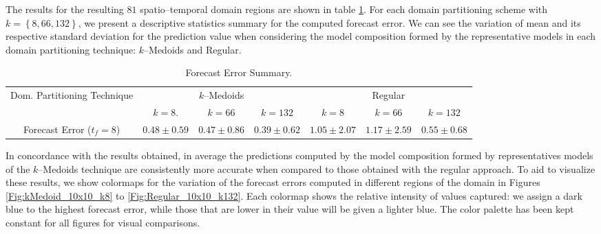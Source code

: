 The results for the resulting $81$ spatio--temporal domain regions are shown in table \ref{Table:Query10x10_kMedoids_Regular_StatSummary}. For each domain partitioning scheme with $k = \left\{8, 66, 132 \right\}$, we present a descriptive statistics summary for the computed forecast error. We can see the variation of mean and its respective standard deviation for the prediction value when considering the model composition formed by the representative models in each domain partitioning technique: $k$--Medoids and Regular.

\begin{table}[h!]
	\centering
	\tiny
	\begin{tabular}{|c|c|c|c|c|c|c|}
		\hline
		\multirow{2}{*}{Dom. Partitioning Technique} & \multicolumn{3}{c|}{$k$--Medoids} & \multicolumn{3}{c|}{Regular} \\
		\cline{2-7}
		& $k = 8$. & $k = 66$ & $k = 132$ & $k = 8$ & $k = 66$ & $k = 132$ \\
		\cline{2-7}
		\hline
		Forecast Error ($t_{f}=8$) & $0.48 \pm 0.59$ & $0.47 \pm 0.86$ & $0.39 \pm 0.62$ & $1.05 \pm 2.07$ & $1.17 \pm 2.59$ & $0.55 \pm 0.68$	 \\
		\hline
	\end{tabular}
	\caption{Forecast Error Summary.}
	\label{Table:Query10x10_kMedoids_Regular_StatSummary}
\end{table}

In concordance with the results obtained, in average the predictions computed by the model composition formed by representatives models of the $k$--Medoids technique are consistently more accurate when compared to those obtained with the regular approach. To aid to visualize these results, we show colormaps for the variation of the forecast errors computed in different regions of the domain in Figures \ref{Fig:kMedoid_10x10_k8} to \ref{Fig:Regular_10x10_k132}. Each colormap shows the relative intensity of values captured: we assign a dark blue to the highest forecast error, while those that are lower in their value will be given a lighter blue. The color palette has been kept constant for all figures for visual comparisons.

